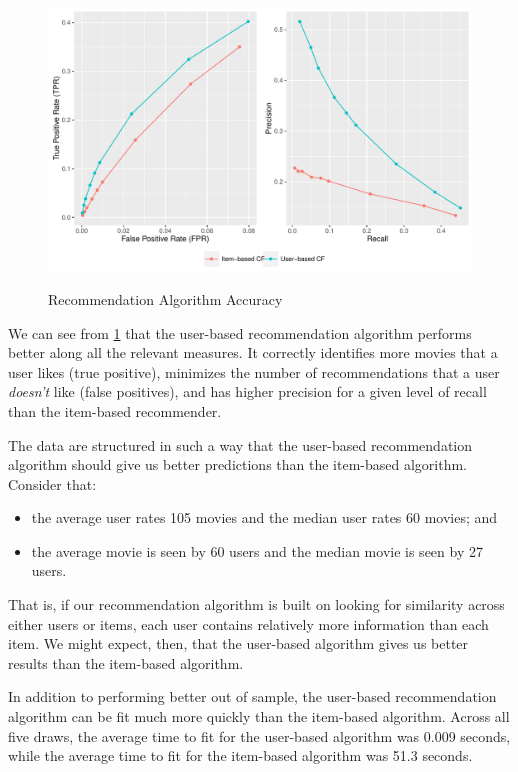 \begin{figure}[!htb]
  \centering
  \caption{Recommendation Algorithm Accuracy}
  \includegraphics[scale=.65]{accuracy.pdf}
  \label{fig:accuracy}
\end{figure}

We can see from \cref{fig:accuracy} that the user-based recommendation algorithm performs better along all the relevant measures. It correctly identifies more movies that a user likes (true positive), minimizes the number of recommendations that a user \textit{doesn't} like (false positives), and has higher precision for a given level of recall than the item-based recommender.

The data are structured in such a way that the user-based recommendation algorithm should give us better predictions than the item-based algorithm. Consider that:
\begin{itemize}
\item the average user rates 105 movies and the median user rates 60 movies; and
\item the average movie is seen by 60 users and the median movie is seen by 27 users.
\end{itemize}
That is, if our recommendation algorithm is built on looking for similarity across either users or items, each user contains relatively more information than each item. We might expect, then, that the user-based algorithm gives us better results than the item-based algorithm.

In addition to performing better out of sample, the user-based recommendation algorithm can be fit much more quickly than the item-based algorithm. Across all five draws, the average time to fit for the user-based algorithm was 0.009 seconds, while the average time to fit for the item-based algorithm was 51.3 seconds.

